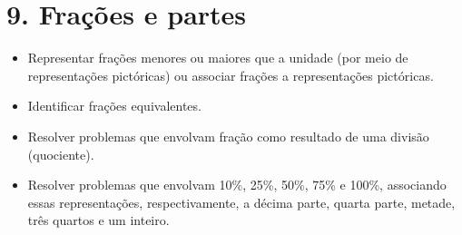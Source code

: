 \chapter{9. Frações e partes}



\begin{itemize}
\item Representar frações menores ou maiores que a unidade (por meio de
representações pictóricas) ou associar frações a representações pictóricas.

\item Identificar frações equivalentes.

\item Resolver problemas que envolvam fração como resultado de uma divisão
(quociente).

\item Resolver problemas que envolvam 10\%, 25\%, 50\%, 75\% e 100\%,
associando essas representações, respectivamente, a décima parte, quarta parte, metade,
três quartos e um inteiro.
\end{itemize}



